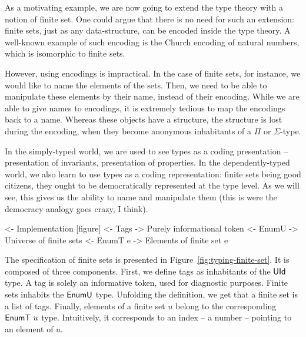 As a motivating example, we are now going to extend the type theory
with a notion of finite set. One could argue that there is no need for
such an extension: finite sets, just as any data-structure, can be
encoded inside the type theory. A well-known example of such encoding
is the Church encoding of natural numbers, which is isomorphic to
finite sets. 



However, using encodings is impractical. In the case of finite sets,
for instance, we would like to name the elements of the sets. Then, we
need to be able to manipulate these elements by their name, instead of
their encoding. While we are able to give names to encodings, it is
extremely tedious to map the encodings back to a name. Whereas these
objects have a structure, the structure is lost during the encoding,
when they become anonymous inhabitants of a $\Pi$ or $\Sigma$-type.

In the simply-typed world, we are used to see types as a coding
presentation -- presentation of invariants, presentation of
properties. In the dependently-typed world, we also learn to use types
as a coding representation: finite sets being good citizens, they
ought to be democratically represented at the type level. As we will
see, this gives us the ability to name and manipulate them (this is
were the democracy analogy goes crazy, I think).


\begin{wstructure}
<- Implementation [figure]      
    <- Tags
        -> Purely informational token
    <- EnumU
        -> Universe of finite sets
    <- EnumT e
        -> Elements of finite set e
\end{wstructure}

The specification of finite sets is presented in
Figure~\ref{fig:typing-finite-set}. It is composed of three
components. First, we define tags as inhabitants of the $\UId$ type. A
tag is solely an informative token, used for diagnostic
purposes. Finite sets inhabits the $\EnumU$ type. Unfolding the
definition, we get that a finite set is a list of tags. Finally,
elements of a finite set $u$ belong to the corresponding $\EnumT{u}$
type. Intuitively, it corresponds to an index -- a number -- pointing
to an element of $u$.

